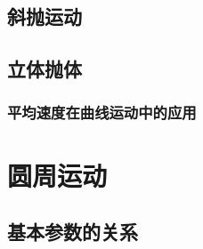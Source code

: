 \documentclass[cn,blue,11pt,normal]{elegantnote}
\begin{document}
\subsection{斜抛运动}
\begin{proset}
	
\end{proset}

\begin{proset}
	
\end{proset}

\begin{proset}
	
\end{proset}

\begin{proset}
	
\end{proset}

\subsection{立体抛体}
\begin{proset}
	
\end{proset}

\subsubsection{平均速度在曲线运动中的应用}
\begin{proset}
	
\end{proset}
\begin{proset}
	
\end{proset}

\begin{proset}
	
\end{proset}


\newpage
\section{圆周运动}
\subsection{基本参数的关系}
\begin{proset}
	
\end{proset}
\begin{proset}
	
\end{proset}
\begin{proset}
	
\end{proset}
\begin{proset}
	
\end{proset}
\begin{proset}
	
\end{proset}
\begin{proset}
	
\end{proset}
\end{document}
